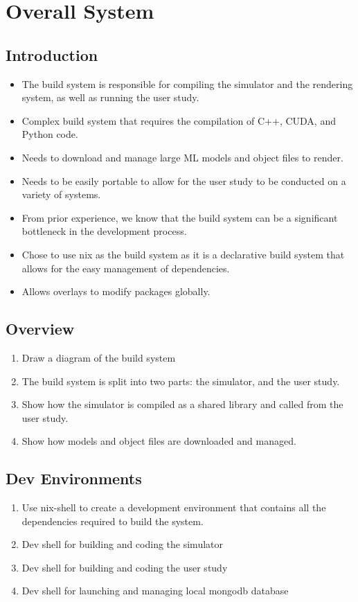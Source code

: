 \section{Overall System}

\subsection{Introduction}
\begin{itemize}
	\item The build system is responsible for compiling the simulator and the rendering system, as well as running the user study.
	\item Complex build system that requires the compilation of C++, CUDA, and Python code.
	\item Needs to download and manage large ML models and object files to render.
	\item Needs to be easily portable to allow for the user study to be conducted on a variety of systems.
	\item From prior experience, we know that the build system can be a significant bottleneck in the development process.
	\item Chose to use nix as the build system as it is a declarative build system that allows for the easy management of dependencies.
	\item Allows overlays to modify packages globally.
\end{itemize}

\subsection{Overview}
\begin{enumerate}
	\item Draw a diagram of the build system
	\item The build system is split into two parts: the simulator, and the user study.
	\item Show how the simulator is compiled as a shared library and called from the user study.
	\item Show how models and object files are downloaded and managed.
\end{enumerate}

\subsection{Dev Environments}
\begin{enumerate}
	\item Use nix-shell to create a development environment that contains all the dependencies required to build the system.
	\item Dev shell for building and coding the simulator
	\item Dev shell for building and coding the user study
	\item Dev shell for launching and managing local mongodb database
\end{enumerate}

